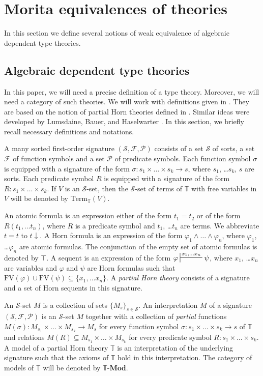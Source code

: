 \documentclass[reqno]{amsart}
\theoremstyle{definition}
\theoremstyle{remark}
\newcommand{\cat}[1]{\mathbf{#1}}
\newcommand{\Mod}[1]{#1\text{-}\cat{Mod}}
\newcommand{\Term}{\mathrm{Term}}
\newcommand{\FV}{\mathrm{FV}}
\numberwithin{figure}{section}
\begin{document}
\section{Morita equivalences of theories}
\label{sec:morita}

In this section we define several notions of weak equivalence of algebraic dependent type theories.

\subsection{Algebraic dependent type theories}

In this paper, we will need a precise definition of a type theory.
Moreover, we will need a category of such theories.
We will work with definitions given in \cite{alg-tt}.
They are based on the notion of partial Horn theories defined in \cite{PHL}.
Similar ideas were developed by Lumsdaine, Bauer, and Haselwarter \cite{lum-tt}.
In this section, we briefly recall necessary definitions and notations.

A many sorted first-order signature $(\mathcal{S},\mathcal{F},\mathcal{P})$ consists of a set $\mathcal{S}$ of sorts,
a set $\mathcal{F}$ of function symbols and a set $\mathcal{P}$ of predicate symbols.
Each function symbol $\sigma$ is equipped with a signature of the form $\sigma : s_1 \times \ldots \times s_k \to s$, where $s_1$, \ldots $s_k$, $s$ are sorts.
Each predicate symbol $R$ is equipped with a signature of the form $R : s_1 \times \ldots \times s_k$.
If $V$ is an $\mathcal{S}$-set, then the $\mathcal{S}$-set of terms of $\mathbb{T}$ with free variables in $V$ will be denoted by $\Term_\mathbb{T}(V)$.

An atomic formula is an expression either of the form $t_1 = t_2$ or of the form $R(t_1, \ldots t_n)$,
where $R$ is a predicate symbol and $t_1$, \ldots $t_n$ are terms.
We abbreviate $t = t$ to $t\!\downarrow$.
A Horn formula is an expression of the form $\varphi_1 \land \ldots \land \varphi_n$, where $\varphi_1$, \ldots $\varphi_n$ are atomic formulas.
The conjunction of the empty set of atomic formulas is denoted by $\top$.
A sequent is an expression of the form $\varphi \sststile{}{x_1, \ldots x_n} \psi$, where $x_1$, \ldots $x_n$ are variables
and $\varphi$ and $\psi$ are Horn formulas such that $\FV(\varphi) \cup \FV(\psi) \subseteq \{ x_1, \ldots x_n \}$.
A \emph{partial Horn theory} consists of a signature and a set of Horn sequents in this signature.

An $\mathcal{S}$-set $M$ is a collection of sets $\{ M_s \}_{s \in \mathcal{S}}$.
An interpretation $M$ of a signature $(\mathcal{S},\mathcal{F},\mathcal{P})$ is an $\mathcal{S}$-set $M$
together with a collection of \emph{partial} functions $M(\sigma) : M_{s_1} \times \ldots \times M_{s_k} \to M_s$
for every function symbol $\sigma : s_1 \times \ldots \times s_k \to s$ of $\mathbb{T}$
and relations $M(R) \subseteq M_{s_1} \times \ldots \times M_{s_k}$ for every predicate symbol $R : s_1 \times \ldots \times s_k$.
A model of a partial Horn theory $\mathbb{T}$ is an interpretation of the underlying signature such that the axioms of $\mathbb{T}$ hold in this interpretation.
The category of models of $\mathbb{T}$ will be denoted by $\Mod{\mathbb{T}}$.
\end{document}
